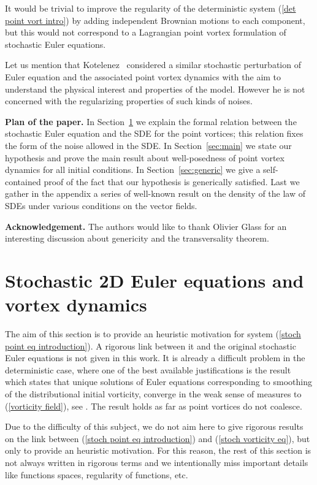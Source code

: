\documentclass[11pt,a4paper]{article}%
\begin{document}
It would be trivial to improve the regularity of the deterministic system
(\ref{det point vort intro}) by adding independent Brownian motions to each
component, but this would not correspond to a Lagrangian point vortex
formulation of stochastic Euler equations.

Let us mention that Kotelenez~\cite[Chapter 8]{Kotelenez} considered a
similar stochastic perturbation of Euler equation and the associated point
vortex dynamics with the aim to understand the physical interest and properties of
the model. However he is not concerned with the regularizing properties of such kinds of noises.

\medskip
\noindent\textbf{Plan of the paper.} In Section~\ref{sec:two} we
explain the formal relation between  the stochastic  Euler
equation and the SDE for the point vortices;  this relation fixes
the form of the noise  allowed in the SDE. In Section~\ref{sec:main}
we state our hypothesis and prove the main result about
well-posedness of point vortex dynamics for all initial conditions.
In Section~\ref{sec:generic} we give a self-contained proof of the
fact that our hypothesis is  generically satisfied. Last we gather
in the appendix a series of well-known result on the density of the
law of SDEs under various conditions on the vector fields.

\medskip
\noindent\textbf{Acknowledgement.}  The authors would like to thank
Olivier Glass for an interesting discussion about genericity and
the transversality theorem.


\section{Stochastic 2D Euler equations and vortex dynamics}
\label{sec:two}

The aim of this section is to provide an heuristic motivation for system
(\ref{stoch point eq introduction}). A rigorous link between it and the
original stochastic Euler equations is not given in this work. It is already a
difficult problem in the deterministic case, where one of the best available
justifications is the result which states that unique solutions of Euler
equations corresponding to smoothing of the distributional initial vorticity,
converge in the weak sense of measures to (\ref{vorticity field}), see
\cite{March Pulv}. The result holds as far as point vortices do not coalesce.

Due to the difficulty of this subject, we do not aim here to give rigorous
results on the link between (\ref{stoch point eq introduction}) and
(\ref{stoch vorticity eq}), but only to provide an heuristic motivation. For
this reason, the rest of this section is not always written in rigorous terms
and we intentionally miss important details like functions spaces, regularity
of functions, etc.
\end{document}
